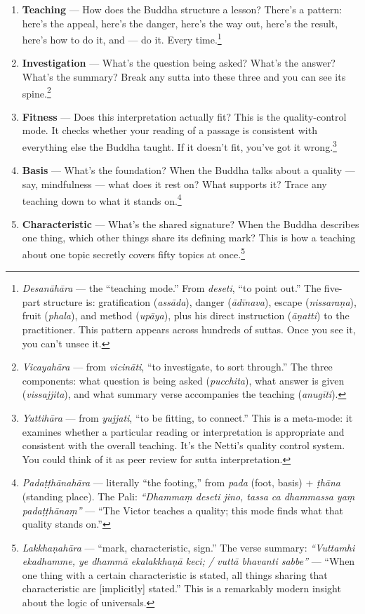 \begin{enumerate}[leftmargin=*, itemsep=8pt]
\item \textbf{Teaching} --- How does the Buddha structure a lesson? There's a pattern: here's the appeal, here's the danger, here's the way out, here's the result, here's how to do it, and --- do it. Every time.\footnote{\textit{Desanāhāra} --- the ``teaching mode.'' From \textit{deseti}, ``to point out.'' The five-part structure is: gratification (\textit{assāda}), danger (\textit{ādīnava}), escape (\textit{nissaraṇa}), fruit (\textit{phala}), and method (\textit{upāya}), plus his direct instruction (\textit{āṇatti}) to the practitioner. This pattern appears across hundreds of suttas. Once you see it, you can't unsee it.}

\item \textbf{Investigation} --- What's the question being asked? What's the answer? What's the summary? Break any sutta into these three and you can see its spine.\footnote{\textit{Vicayahāra} --- from \textit{vicināti}, ``to investigate, to sort through.'' The three components: what question is being asked (\textit{pucchita}), what answer is given (\textit{vissajjita}), and what summary verse accompanies the teaching (\textit{anugīti}).}

\item \textbf{Fitness} --- Does this interpretation actually fit? This is the quality-control mode. It checks whether your reading of a passage is consistent with everything else the Buddha taught. If it doesn't fit, you've got it wrong.\footnote{\textit{Yuttihāra} --- from \textit{yujjati}, ``to be fitting, to connect.'' This is a meta-mode: it examines whether a particular reading or interpretation is appropriate and consistent with the overall teaching. It's the Netti's quality control system. You could think of it as peer review for sutta interpretation.}

\item \textbf{Basis} --- What's the foundation? When the Buddha talks about a quality --- say, mindfulness --- what does it rest on? What supports it? Trace any teaching down to what it stands on.\footnote{\textit{Padaṭṭhānahāra} --- literally ``the footing,'' from \textit{pada} (foot, basis) + \textit{ṭhāna} (standing place). The Pali: \textit{``Dhammaṃ deseti jino, tassa ca dhammassa yaṃ padaṭṭhānaṃ''} --- ``The Victor teaches a quality; this mode finds what that quality stands on.''}

\item \textbf{Characteristic} --- What's the shared signature? When the Buddha describes one thing, which other things share its defining mark? This is how a teaching about one topic secretly covers fifty topics at once.\footnote{\textit{Lakkhaṇahāra} --- ``mark, characteristic, sign.'' The verse summary: \textit{``Vuttamhi ekadhamme, ye dhammā ekalakkhaṇā keci; / vuttā bhavanti sabbe''} --- ``When one thing with a certain characteristic is stated, all things sharing that characteristic are [implicitly] stated.'' This is a remarkably modern insight about the logic of universals.}


\end{enumerate}
